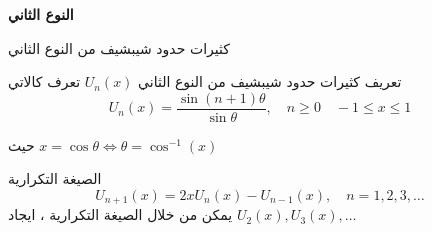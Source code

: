 	
		\begin{frame}
		\begin{center}
			\Huge
			\textbf{النوع الثاني}
		\end{center}
	\end{frame}
	
	\begin{frame}{كثيرات حدود شيبشيف من النوع الثاني}
		\begin{exampleblock}{تعريف}
				كثيرات حدود شيبشيف من النوع الثاني $U_n(x)$ تعرف كالاتي
			\begin{equation}
							U_n(x) = \frac{\sin(n+1)\theta}{\sin\theta},\quad n\geq 0 \quad -1 \leq x \leq 1
			\end{equation}

			
			حيث $x=\cos\theta \iff \theta = \cos^{-1}(x)$
		\end{exampleblock}
		
		\pause
		\begin{exampleblock}{الصيغة التكرارية}
			$$
				U_{n+1}(x) = 2x U_n(x) - U_{n-1}(x), \quad n = 1,2,3,\dots
		$$
	يمكن من خلال الصيغة التكرارية ، ايجاد $U_2(x), U_3(x), \dots$
		\end{exampleblock}
	\end{frame}
	
	

